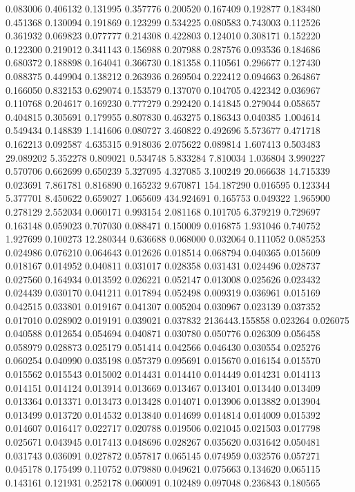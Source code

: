 0.083006
0.406132
0.131995
0.357776
0.200520
0.167409
0.192877
0.183480
0.451368
0.130094
0.191869
0.123299
0.534225
0.080583
0.743003
0.112526
0.361932
0.069823
0.077777
0.214308
0.422803
0.124010
0.308171
0.152220
0.122300
0.219012
0.341143
0.156988
0.207988
0.287576
0.093536
0.184686
0.680372
0.188898
0.164041
0.366730
0.181358
0.110561
0.296677
0.127430
0.088375
0.449904
0.138212
0.263936
0.269504
0.222412
0.094663
0.264867
0.166050
0.832153
0.629074
0.153579
0.137070
0.104705
0.422342
0.036967
0.110768
0.204617
0.169230
0.777279
0.292420
0.141845
0.279044
0.058657
0.404815
0.305691
0.179955
0.807830
0.463275
0.186343
0.040385
1.004614
0.549434
0.148839
1.141606
0.080727
3.460822
0.492696
5.573677
0.471718
0.162213
0.092587
4.635315
0.918036
2.075622
0.089814
1.607413
0.503483
29.089202
5.352278
0.809021
0.534748
5.833284
7.810034
1.036804
3.990227
0.570706
0.662699
0.650239
5.327095
4.327085
3.100249
20.066638
14.715339
0.023691
7.861781
0.816890
0.165232
9.670871
154.187290
0.016595
0.123344
5.377701
8.450622
0.659027
1.065609
434.924691
0.165753
0.049322
1.965900
0.278129
2.552034
0.060171
0.993154
2.081168
0.101705
6.379219
0.729697
0.163148
0.059023
0.707030
0.088471
0.150009
0.016875
1.931046
0.740752
1.927699
0.100273
12.280344
0.636688
0.068000
0.032064
0.111052
0.085253
0.024986
0.076210
0.064643
0.012626
0.018514
0.068794
0.040365
0.015609
0.018167
0.014952
0.040811
0.031017
0.028358
0.031431
0.024496
0.028737
0.027560
0.164934
0.013592
0.026221
0.052147
0.013008
0.025626
0.023432
0.024439
0.030170
0.041211
0.017894
0.052498
0.009319
0.036961
0.015169
0.042515
0.033801
0.019167
0.041307
0.005204
0.030967
0.023139
0.037352
0.017010
0.028902
0.019191
0.039021
0.037832
2136443.155858
0.023264
0.026075
0.040588
0.012654
0.054694
0.040871
0.030780
0.050776
0.026309
0.056458
0.058979
0.028873
0.025179
0.051414
0.042566
0.046430
0.030554
0.025276
0.060254
0.040990
0.035198
0.057379
0.095691
0.015670
0.016154
0.015570
0.015562
0.015543
0.015002
0.014431
0.014410
0.014449
0.014231
0.014113
0.014151
0.014124
0.013914
0.013669
0.013467
0.013401
0.013440
0.013409
0.013364
0.013371
0.013473
0.013428
0.014071
0.013906
0.013882
0.013904
0.013499
0.013720
0.014532
0.013840
0.014699
0.014814
0.014009
0.015392
0.014607
0.016417
0.022717
0.020788
0.019506
0.021045
0.021503
0.017798
0.025671
0.043945
0.017413
0.048696
0.028267
0.035620
0.031642
0.050481
0.031743
0.036091
0.027872
0.057817
0.065145
0.074959
0.032576
0.057271
0.045178
0.175499
0.110752
0.079880
0.049621
0.075663
0.134620
0.065115
0.143161
0.121931
0.252178
0.060091
0.102489
0.097048
0.236843
0.180565
